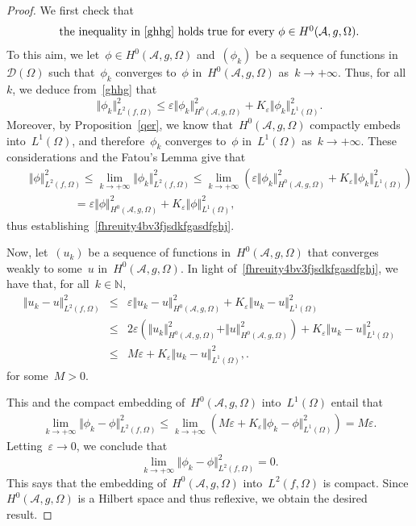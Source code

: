 \documentclass[11pt,hyp,]{nyjm}
\numberwithin{equation}{section}
\newcommand{\N}{\mathbb{N}}
\theoremstyle{remark}
\newcommand{\am}{\mathcal{A}}
\renewcommand{\leq}{\leqslant}
\renewcommand{\le}{\leqslant}
\renewcommand{\epsilon}{\varepsilon}
\begin{document}
				\begin{proof}
We first check that
\begin{equation}\label{fhreuity4bv3fjsdkfgasdfghj}
{\mbox{the inequality in~\eqref{ghhg} holds true for every~$\phi\in H^0(\am, g, \Omega)$.}}
\end{equation}				
To this aim, we let~$\phi\in H^0(\am, g, \Omega)$ and~$(\phi_k)$ be a sequence
of functions in~${\mathcal{D}}(\Omega)$ such that~$\phi_k$ converges
to~$\phi$ in~$H^0(\am, g, \Omega)$ as~$k\to+\infty$. Thus, for all~$k$, we deduce from~\eqref{ghhg} that
$$ \Vert \phi_k \Vert_{L^2(f, \Omega)}^2 \leq \epsilon \Vert \phi_k \Vert^2_{H^0(\am, g, \Omega )} + K_{\epsilon} \Vert \phi_k \Vert_{L^1(\Omega)}^2 .$$
Moreover, by Proposition~\ref{qer}, we know that~$H^0(\am, g, \Omega)$ compactly embeds into~$L^1(\Omega)$,
and therefore~$\phi_k$ converges
to~$\phi$ in~$L^1(\Omega)$ as~$k\to+\infty$. These considerations and the Fatou's Lemma give that
\begin{eqnarray*}&&
\Vert \phi \Vert_{L^2(f, \Omega)}^2\le \lim_{k\to+\infty} \Vert \phi_k \Vert_{L^2(f, \Omega)}^2 \le  \lim_{k\to+\infty}\left(\epsilon \Vert \phi_k \Vert^2_{H^0(\am, g, \Omega )} + K_{\epsilon} \Vert \phi_k \Vert_{L^1(\Omega)}^2\right)\\
&&\qquad\qquad =\epsilon \Vert \phi\Vert^2_{H^0(\am, g, \Omega )} + K_{\epsilon} \Vert \phi \Vert_{L^1(\Omega)}^2,
\end{eqnarray*}
thus establishing~\eqref{fhreuity4bv3fjsdkfgasdfghj}.

Now, let~$(u_k)$ be a sequence of functions in~$H^0(\am, g, \Omega )$
that converges weakly to some~$u$ in~$H^0(\am, g, \Omega )$. 
In light of~\eqref{fhreuity4bv3fjsdkfgasdfghj}, we have that, for all~$k\in\N$,
\begin{eqnarray*} \Vert u_k - u \Vert_{L^2(f, \Omega)}^2 &\leq& \epsilon \Vert u_k - u \Vert^2_{H^0(\am, g, \Omega )} + K_{\epsilon} \Vert u_k- u \Vert_{L^1(\Omega)}^2 \\
&\leq&2 \epsilon\left( \Vert u_k \Vert^2_{H^0(\am, g, \Omega )}+\Vert u \Vert^2_{H^0(\am, g, \Omega )}\right) + K_{\epsilon} \Vert u_k- u \Vert_{L^1(\Omega)}^2\\
&\le& M\varepsilon+ K_{\epsilon} \Vert u_k- u \Vert_{L^1(\Omega)}^2,
.\end{eqnarray*}
for some~$M>0$.

This and the compact embedding of~$H^0(\am, g, \Omega)$ into~$L^1(\Omega)$ entail that
					\begin{align*}
						\lim_{k \to +\infty} \Vert \phi_k - \phi \Vert_{L^2(f, \Omega)}^2 \leq \lim_{k \to +\infty} \left( M \epsilon + K_{\epsilon} \Vert \phi_k - \phi \Vert_{L^1(\Omega)}^2 \right) = M \epsilon.
					\end{align*} 
					Letting~$\epsilon \to 0$, we conclude that
$$ \lim_{k \to +\infty} \Vert \phi_k - \phi \Vert_{L^2(f, \Omega)}^2=0.$$
This says that the embedding of~$H^0(\am, g, \Omega )$ into~$L^2(f, \Omega)$ is compact.
Since $H^0(\am, g, \Omega )$ is a Hilbert space and thus reflexive, we obtain the desired result.
\end{proof}
				
\end{document}
